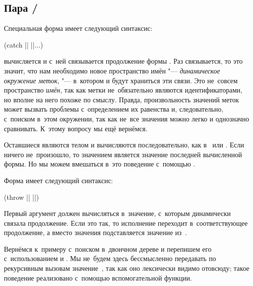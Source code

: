 \subsection{\texorpdfstring%
{Пара \protect{}/\protect{}}%
{Пара catch/throw}}%
\label{escape/handling/ssect:catch-throw}

Специальная форма  имеет следующий синтаксис:

\begin{code:lisp}
(catch || ||...)
\end{code:lisp}

 вычисляется и с~ней связывается продолжение формы . Раз
связывается, то это значит, что нам необходимо новое пространство имён "---
\emph{динамическое окружение меток}, "--- в~котором и будут храниться эти связи.
Это не~совсем пространство \emph{имён}, так как метки не~обязательно являются
идентификаторами, но вполне на него похоже по смыслу. Правда, произвольность
значений меток может вызвать проблемы с~определением их равенства и,
следовательно, с~поиском в~этом окружении, так как не~все значения можно легко
и однозначно сравнивать. К~этому вопросу мы ещё вернёмся.

Оставшиеся  являются телом  и вычисляются последовательно,
как в~ или . Если ничего не~произошло, то значением
 является значение последней вычисленной формы. Но мы можем вмешаться
в~это поведение с~помощью .

Форма  имеет следующий синтаксис:

\begin{code:lisp}
(throw || ||)
\end{code:lisp}

\noindent
Первый аргумент должен вычисляться в~значение, с~которым  динамически
связала продолжение. Если это так, то исполнение переходит в~соответствующее
продолжение, а вместо значения  подставляется значение 
из~.

Вернёмся к~примеру с~поиском в~двоичном дереве и перепишем его с~использованием
 и . Мы не~будем здесь бессмысленно передавать по
рекурсивным вызовам значение~, так как оно лексически видимо отовсюду;
такое поведение реализовано с~помощью вспомогательной функции.

